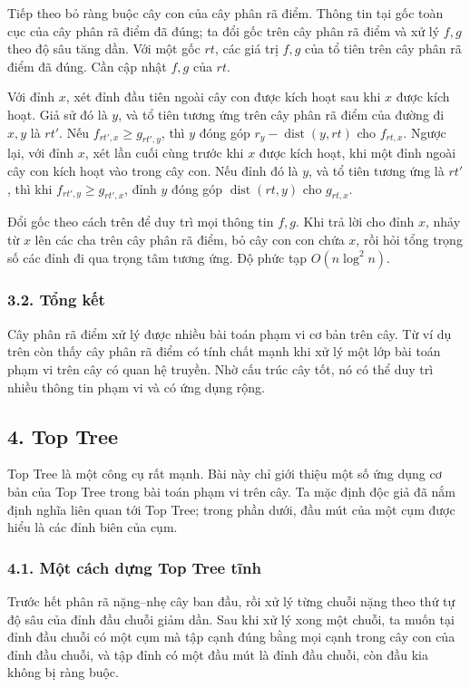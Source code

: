 \documentclass[11pt]{article}
\begin{document}
Tiếp theo bỏ ràng buộc cây con của cây phân rã điểm. Thông tin tại gốc toàn
cục của cây phân rã điểm đã đúng; ta đổi gốc trên cây phân rã điểm và xử lý
\(f,g\) theo độ sâu tăng dần. Với một gốc \(rt\), các giá trị \(f,g\) của tổ
tiên trên cây phân rã điểm đã đúng. Cần cập nhật \(f,g\) của \(rt\).

Với đỉnh \(x\), xét đỉnh đầu tiên ngoài cây con được kích hoạt sau khi \(x\)
được kích hoạt. Giả sử đó là \(y\), và tổ tiên tương ứng trên cây phân rã điểm
của đường đi \(x,y\) là \(rt'\). Nếu \(f_{rt',x}\ge g_{rt',y}\), thì \(y\)
đóng góp \(r_y-\operatorname{dist}(y,rt)\) cho \(f_{rt,x}\). Ngược lại, với
đỉnh \(x\), xét lần cuối cùng trước khi \(x\) được kích hoạt, khi một đỉnh
ngoài cây con kích hoạt vào trong cây con. Nếu đỉnh đó là \(y\), và tổ tiên
tương ứng là \(rt'\), thì khi \(f_{rt',y}\ge g_{rt',x}\), đỉnh \(y\) đóng góp
\(\operatorname{dist}(rt,y)\) cho \(g_{rt,x}\).

Đổi gốc theo cách trên để duy trì mọi thông tin \(f,g\). Khi trả lời cho đỉnh
\(x\), nhảy từ \(x\) lên các cha trên cây phân rã điểm, bỏ cây con con chứa
\(x\), rồi hỏi tổng trọng số các đỉnh đi qua trọng tâm tương ứng. Độ phức tạp
\(O(n\log^2 n)\).

\subsubsection*{3.2. Tổng kết}

Cây phân rã điểm xử lý được nhiều bài toán phạm vi cơ bản trên cây. Từ ví dụ
trên còn thấy cây phân rã điểm có tính chất mạnh khi xử lý một lớp bài toán
phạm vi trên cây có quan hệ truyền. Nhờ cấu trúc cây tốt, nó có thể duy trì
nhiều thông tin phạm vi và có ứng dụng rộng.

\subsection*{4. Top Tree}

Top Tree là một công cụ rất mạnh. Bài này chỉ giới thiệu một số ứng dụng cơ
bản của Top Tree trong bài toán phạm vi trên cây. Ta mặc định độc giả đã nắm
định nghĩa liên quan tới Top Tree; trong phần dưới, đầu mút của một cụm được
hiểu là các đỉnh biên của cụm.

\subsubsection*{4.1. Một cách dựng Top Tree tĩnh}

Trước hết phân rã nặng--nhẹ cây ban đầu, rồi xử lý từng chuỗi nặng theo thứ tự
độ sâu của đỉnh đầu chuỗi giảm dần. Sau khi xử lý xong một chuỗi, ta muốn tại
đỉnh đầu chuỗi có một cụm mà tập cạnh đúng bằng mọi cạnh trong cây con của
đỉnh đầu chuỗi, và tập đỉnh có một đầu mút là đỉnh đầu chuỗi, còn đầu kia
không bị ràng buộc.
\end{document}
